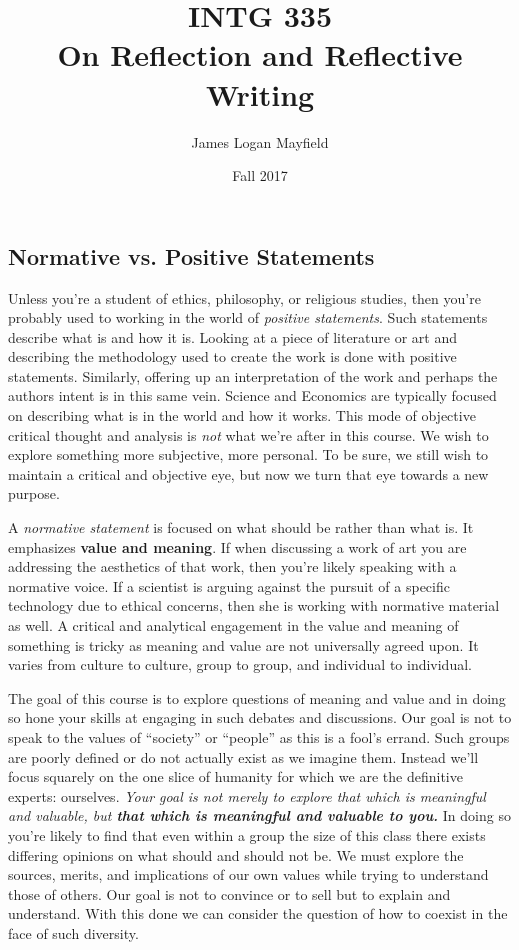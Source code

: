 \documentclass[nobib]{tufte-handout}
\title{INTG 335 \\ On Reflection and Reflective Writing}
\author{James Logan Mayfield }
\date{ Fall 2017 }
\begin{document}
\maketitle
\thispagestyle{empty}

\subsection*{Normative vs. Positive Statements}

Unless you're a student of ethics, philosophy, or religious studies, then you're probably used to working in the world of  \textit{positive statements}. Such statements describe what is and how it is.  Looking at a piece of literature or art and describing the methodology used to create the work is done with positive statements. Similarly, offering up an interpretation of the work and perhaps the authors intent is in this same vein. Science and Economics are typically focused on describing what is in the world and how it works. This mode of objective critical thought and analysis is \textit{not} what we're after in this course. We wish to explore something more subjective, more personal. To be sure, we still wish to maintain a critical and objective eye, but now we turn that eye towards a new purpose.

A \textit{normative statement} is focused on what should be rather than what is. It emphasizes \textbf{value and meaning}.  If when discussing a work of art you are addressing the aesthetics of that work, then you're likely speaking with a normative voice. If a scientist is arguing against the pursuit of a specific technology due to ethical concerns, then she is working with normative material as well. A critical and analytical engagement in the value and meaning of something is tricky as meaning and value are not universally agreed upon. It varies from culture to culture, group to group, and individual to individual.

The goal of this course is to explore questions of meaning and value and in doing so hone your skills at engaging in such debates and discussions. Our goal is not to speak to the values of ``society'' or ``people'' as this is a fool's errand. Such groups are poorly defined or do not actually exist as we imagine them.  Instead we'll focus squarely on the one slice of humanity for which we are the definitive experts: ourselves. \textit{Your goal is not merely to explore that which is meaningful and valuable, but \textbf{that which is meaningful and valuable to you.}} In doing so you're likely to find that even within a group the size of this class there exists differing opinions on what should and should not be. We must explore the sources, merits, and implications of our own values while trying to understand those of others. Our goal is not to convince or to sell but to explain and understand. With this done we can consider the question of how to coexist in the face of such diversity.
\end{document}
